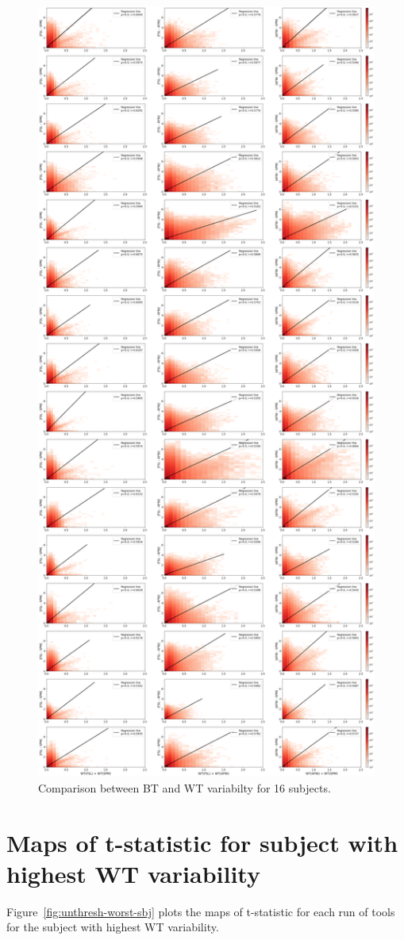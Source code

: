 \documentclass[11pt,onecolumn]{article}
\begin{document}
\begin{figure}[ht]
  \centering
  \includegraphics[width=.55\textwidth]{figures/sbj-abs-corr-unthresh-plot.png}
  \caption{Comparison between BT and WT variabilty for 16 subjects.}
  \label{fig:unthresh-correlation-allsbj}
\end{figure}

\section{Maps of t-statistic for subject with highest WT variability}
\label{sec:supp-worst-subject}

Figure~\ref{fig:unthresh-worst-sbj} plots the maps of t-statistic
for each run of tools for the subject with highest WT variability.
\end{document}
